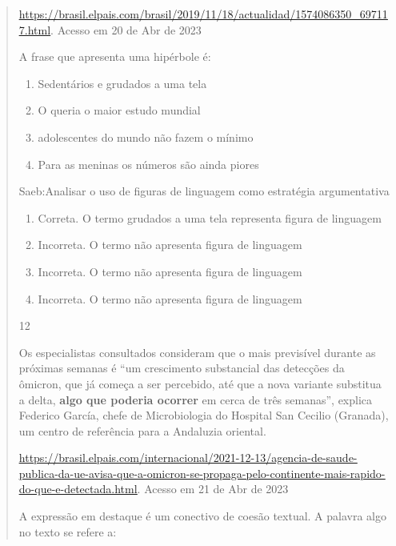 {\begin{quote}
{\begin{itemize}
\begin{itemize}
\href{https://brasil.elpais.com/brasil/2019/11/18/actualidad/1574086350_697117.html}{\uline{https://brasil.elpais.com/brasil/2019/11/18/actualidad/1574086350\_697117.html}}.
Acesso em 20 de Abr de 2023

A frase que apresenta uma hipérbole é:

\begin{enumerate}

\item
  Sedentários e grudados a uma tela
\item
  O queria o maior estudo mundial
\item
  adolescentes do mundo não fazem o mínimo
\item
  Para as meninas os números são ainda piores
\end{enumerate}

Saeb:Analisar o uso de figuras de linguagem como estratégia
argumentativa

\begin{enumerate}
\def\labelenumi{\arabic{enumi}.}
\item
  Correta. O termo grudados a uma tela representa figura de linguagem
\item
  Incorreta. O termo não apresenta figura de linguagem
\item
  Incorreta. O termo não apresenta figura de linguagem
\item
  Incorreta. O termo não apresenta figura de linguagem
\end{enumerate}

\num{12}

Os especialistas consultados consideram que o mais previsível durante as
próximas semanas é ``um crescimento substancial das detecções da
ômicron, que já começa a ser percebido, até que a nova variante
substitua a delta, \textbf{algo que poderia ocorrer} em cerca de três
semanas'', explica Federico García, chefe de Microbiologia do Hospital
San Cecilio (Granada), um centro de referência para a Andaluzia
oriental.

\href{https://brasil.elpais.com/internacional/2021-12-13/agencia-de-saude-publica-da-ue-avisa-que-a-omicron-se-propaga-pelo-continente-mais-rapido-do-que-e-detectada.html}{\uline{https://brasil.elpais.com/internacional/2021-12-13/agencia-de-saude-publica-da-ue-avisa-que-a-omicron-se-propaga-pelo-continente-mais-rapido-do-que-e-detectada.html}}.
Acesso em 21 de Abr de 2023

A expressão em destaque é um conectivo de coesão textual. A palavra algo
no texto se refere a:


\end{itemize}
\end{itemize}}
\end{quote}}
